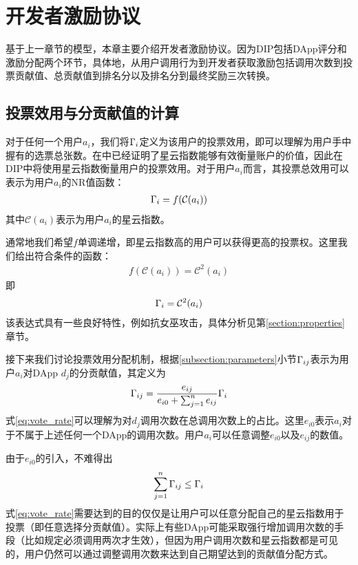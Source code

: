 \section{开发者激励协议}
基于上一章节的模型，本章主要介绍开发者激励协议。因为DIP包括DApp评分和激励分配两个环节，具体地，从用户调用行为到开发者获取激励包括调用次数到投票贡献值、总贡献值到排名分以及排名分到最终奖励三次转换。

\subsection{投票效用与分贡献值的计算}
对于任何一个用户$a_i$，我们将$\Gamma_i$定义为该用户的投票效用，即可以理解为用户手中握有的选票总张数。在\cite{Nebulasyellowpaper}中已经证明了星云指数能够有效衡量账户的价值，因此在DIP中将使用星云指数衡量用户的投票效用。对于用户$a_i$而言，其投票总效用可以表示为用户$a_i$的NR值函数：
\begin{align}
\Gamma_i = f(\mathcal{C}(a_i))
\end{align}
其中$\mathcal{C}(a_i)$表示为用户$a_i$的星云指数。

通常地我们希望$f$单调递增，即星云指数高的用户可以获得更高的投票权。这里我们给出符合条件的函数：
\begin{align}
f(\mathcal{C}(a_i))=\mathcal{C}^2(a_i)
\end{align}
即
\begin{align}
\Gamma_i = \mathcal{C}^2(a_i)
\end{align}
该表达式具有一些良好特性，例如抗女巫攻击，具体分析见第\ref{section:properties}章节。

接下来我们讨论投票效用分配机制，根据\ref{subsection:parameters}小节$\Gamma_{ij}$表示为用户$a_i$对DApp $d_j$的分贡献值，其定义为
\begin{align}
\label{eq:vote_rate}
\Gamma_{ij} = \frac{e_{ij}}{e_{i0}+\sum_{j=1}^n {e_{ij}}} \Gamma_i
\end{align}
式\ref{eq:vote_rate}可以理解为对$d_j$调用次数在总调用次数上的占比。这里$e_{i0}$表示$a_i$对于不属于上述任何一个DApp的调用次数。用户$a_i$可以任意调整$e_{i0}$以及$e_{ij}$的数值。

由于$e_{i0}$的引入，不难得出
$$\sum_{j=1}^n \Gamma_{ij} \leq \Gamma_i$$
\noindent 式\ref{eq:vote_rate}需要达到的目的仅仅是让用户可以任意分配自己的星云指数用于投票（即任意选择分贡献值）。实际上有些DApp可能采取强行增加调用次数的手段（比如规定必须调用两次才生效），但因为用户调用次数和星云指数都是可见的，用户仍然可以通过调整调用次数来达到自己期望达到的贡献值分配方式。

